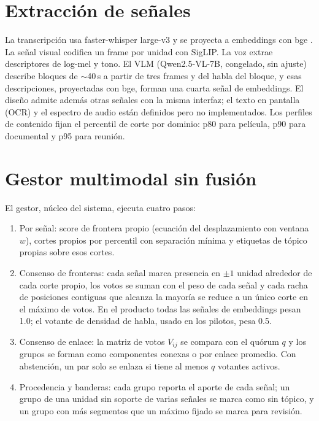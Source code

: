 \section{Extracción de señales}

La transcripción usa faster-whisper large-v3
\cite{radford2023whisper} y se proyecta a embeddings con bge \cite{xiao2023bge}. La señal
visual codifica un frame por unidad con SigLIP. La voz extrae descriptores de log-mel y tono.
El VLM (Qwen2.5-VL-7B, congelado, sin ajuste) describe bloques de $\sim$40\,s a partir de
tres frames y del habla del bloque, y esas descripciones, proyectadas con bge, forman una
cuarta señal de embeddings. El diseño admite además otras señales con la misma interfaz;
el texto en pantalla (OCR) y el espectro de audio están definidos pero no implementados. Los perfiles de contenido fijan
el percentil de corte por dominio: p80 para película, p90 para documental y p95 para reunión.

\section{Gestor multimodal sin fusión}

El gestor, núcleo del sistema, ejecuta cuatro pasos:

\begin{enumerate}
  \item Por señal: score de frontera propio (ecuación del desplazamiento con ventana $w$),
        cortes propios por percentil con separación mínima y etiquetas de tópico propias
        sobre esos cortes.
  \item Consenso de fronteras: cada señal marca presencia en $\pm 1$ unidad alrededor de
        cada corte propio, los votos se suman con el peso de cada señal y cada racha de
        posiciones contiguas que alcanza la mayoría se reduce a un único corte en el máximo
        de votos. En el producto todas las señales de embeddings pesan 1.0; el votante de
        densidad de habla, usado en los pilotos, pesa 0.5.
  \item Consenso de enlace: la matriz de votos $V_{ij}$ se compara con el quórum $q$ y los
        grupos se forman como componentes conexas o por enlace promedio. Con abstención, un par solo se enlaza si tiene al
        menos $q$ votantes activos.
  \item Procedencia y banderas: cada grupo reporta el aporte de cada señal; un grupo de una
        unidad sin soporte de varias señales se marca como sin tópico, y un grupo con más
        segmentos que un máximo fijado se marca para revisión.
\end{enumerate}

